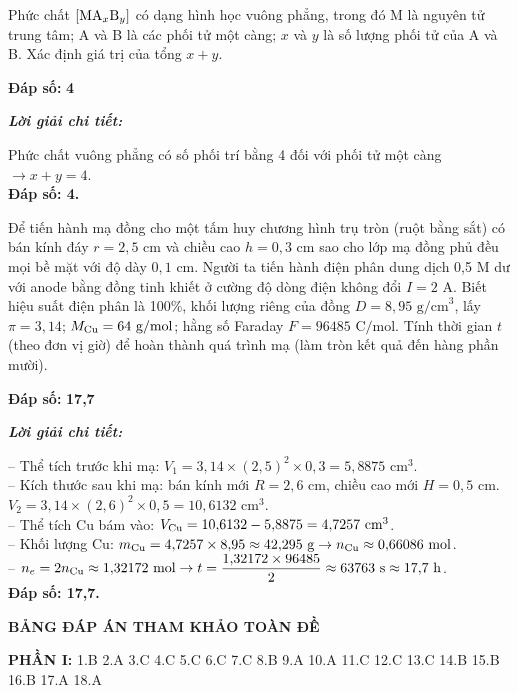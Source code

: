\documentclass[11pt,a4paper]{article}
\def\loigiai#1{
\par\begingroup\color{blue!80!black}\small
\noindent\textbf{\textit{Lời giải chi tiết:}}\par
#1\par\endgroup}
\begin{document}
\begin{ex}
Phức chất $\ce{[MA_{$x$}B_{$y$}]}$ có dạng hình học vuông phẳng, trong đó M là nguyên tử trung tâm; A và B là các phối tử một càng; $x$ và $y$ là số lượng phối tử của A và B. Xác định giá trị của tổng $x + y$.
\par\noindent\textbf{Đáp số:} \textbf{\color{red}4}
\loigiai{
Phức chất vuông phẳng có số phối trí bằng 4 đối với phối tử một càng $\rightarrow x + y = 4$.\\
\textbf{Đáp số: 4.}}
\end{ex}

\begin{ex}
Để tiến hành mạ đồng cho một tấm huy chương hình trụ tròn (ruột bằng sắt) có bán kính đáy $r = 2{,}5\text{ cm}$ và chiều cao $h = 0{,}3\text{ cm}$ sao cho lớp mạ đồng phủ đều mọi bề mặt với độ dày $0{,}1\text{ cm}$. Người ta tiến hành điện phân dung dịch  0,5 M dư với anode bằng đồng tinh khiết ở cường độ dòng điện không đổi $I = 2\text{ A}$. Biết hiệu suất điện phân là 100\%, khối lượng riêng của đồng $D = 8{,}95\text{ g/cm}^3$, lấy $\pi = 3{,}14$; $M_{\ce{Cu}} = 64\text{ g/mol}$; hằng số Faraday $F = 96485\text{ C/mol}$. Tính thời gian $t$ (theo đơn vị giờ) để hoàn thành quá trình mạ (làm tròn kết quả đến hàng phần mười).
\par\noindent\textbf{Đáp số:} \textbf{\color{red}17,7}
\loigiai{
-- Thể tích trước khi mạ: $V_1 = 3{,}14 \times (2{,}5)^2 \times 0{,}3 = 5{,}8875\text{ cm}^3$.\\
-- Kích thước sau khi mạ: bán kính mới $R = 2{,}6\text{ cm}$, chiều cao mới $H = 0{,}5\text{ cm}$.\\
$V_2 = 3{,}14 \times (2{,}6)^2 \times 0{,}5 = 10{,}6132\text{ cm}^3$.\\
-- Thể tích Cu bám vào: $V_{\ce{Cu}} = 10{,}6132 - 5{,}8875 = 4{,}7257\text{ cm}^3$.\\
-- Khối lượng Cu: $m_{\ce{Cu}} = 4{,}7257 \times 8{,}95 \approx 42{,}295\text{ g} \rightarrow n_{\ce{Cu}} \approx 0{,}66086\text{ mol}$.\\
-- $n_e = 2 n_{\ce{Cu}} \approx 1{,}32172\text{ mol} \rightarrow t = \dfrac{1{,}32172 \times 96485}{2} \approx 63763\text{ s} \approx 17{,}7\text{ h}$.\\
\textbf{Đáp số: 17,7.}}
\end{ex}

\vspace{0.3cm}
\noindent
\textbf{\color{hfRed}\large BẢNG ĐÁP ÁN THAM KHẢO TOÀN ĐỀ}

\vspace{0.1cm}
\noindent
\textbf{\color{mainGreen}PHẦN I:} 1.B \quad 2.A \quad 3.C \quad 4.C \quad 5.C \quad 6.C \quad 7.C \quad 8.B \quad 9.A \quad 10.A \quad 11.C \quad 12.C \quad 13.C \quad 14.B \quad 15.B \quad 16.B \quad 17.A \quad 18.A
\end{document}
